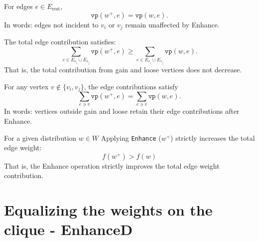 \begin{lemma}
  \label{lem:Enhance_sum_complement_unchanged}
  \leanok
For edges \(e \in E_{\mathrm{rest}}\),
\[
\texttt{vp}(w^+, e) = \texttt{vp}(w, e).
\]
In words: edges not incident to \(v_i\) or \(v_j\) remain unaffected by Enhance.
\end{lemma}

\begin{lemma}
  \label{lem:Enhance_edge_gainloose_increase}
  \leanok
The total edge contribution satisfies:
\[
\sum_{e \in E_{v_i} \cup E_{v_j}} \texttt{vp}(w^+, e) \geq \sum_{e \in E_{v_i} \cup E_{v_j}} \texttt{vp}(w, e).
\]
That is, the total contribution from gain and loose vertices does not decrease.
\end{lemma}

\begin{lemma}
  \label{lem:Enhance_support_edges_same}
  \leanok
For any vertex \(v \notin \{v_i, v_j\}\), the edge contributions satisfy
\[
\sum_{e \ni v} \texttt{vp}(w^+, e) = \sum_{e \ni v} \texttt{vp}(w, e).
\]
In words: vertices outside gain and loose retain their edge contributions after Enhance.
\end{lemma}

\begin{theorem}
  \label{thm:Enhance_total_weight_stricinc}
  \leanok
For a given distribution \(w\in W\) Applying \texttt{Enhance} (\(w^+\)) strictly increases the total edge weight:
\[
f(w^+) > f(w)
\]
That is, the Enhance operation strictly improves the total edge weight contribution.
\end{theorem}

\section{Equalizing the weights on the clique - EnhanceD}


